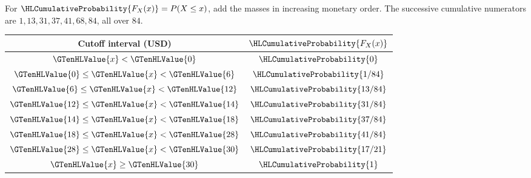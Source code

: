 For $\HLCumulativeProbability{F_X(x)}=P(X\leq x)$, add the masses in increasing monetary order. The successive cumulative numerators are $1,13,31,37,41,68,84$, all over $84$.
\begin{center}
\begin{tabular}{cc}\toprule
Cutoff interval (USD) & $\HLCumulativeProbability{F_X(x)}$\\\midrule
$\GTenHLValue{x}<\GTenHLValue{0}$ & $\HLCumulativeProbability{0}$\\
$\GTenHLValue{0}\leq \GTenHLValue{x}<\GTenHLValue{6}$ & $\HLCumulativeProbability{1/84}$\\
$\GTenHLValue{6}\leq \GTenHLValue{x}<\GTenHLValue{12}$ & $\HLCumulativeProbability{13/84}$\\
$\GTenHLValue{12}\leq \GTenHLValue{x}<\GTenHLValue{14}$ & $\HLCumulativeProbability{31/84}$\\
$\GTenHLValue{14}\leq \GTenHLValue{x}<\GTenHLValue{18}$ & $\HLCumulativeProbability{37/84}$\\
$\GTenHLValue{18}\leq \GTenHLValue{x}<\GTenHLValue{28}$ & $\HLCumulativeProbability{41/84}$\\
$\GTenHLValue{28}\leq \GTenHLValue{x}<\GTenHLValue{30}$ & $\HLCumulativeProbability{17/21}$\\
$\GTenHLValue{x}\geq \GTenHLValue{30}$ & $\HLCumulativeProbability{1}$\\
\bottomrule\end{tabular}
\end{center}
